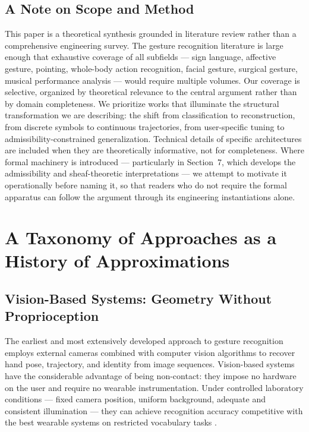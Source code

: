 \documentclass[11pt, a4paper]{article}
\theoremstyle{definition}
\begin{document}
\subsection{A Note on Scope and Method}

This paper is a theoretical synthesis grounded in literature review rather than a comprehensive engineering survey. The gesture recognition literature is large enough that exhaustive coverage of all subfields --- sign language, affective gesture, pointing, whole-body action recognition, facial gesture, surgical gesture, musical performance analysis --- would require multiple volumes. Our coverage is selective, organized by theoretical relevance to the central argument rather than by domain completeness. We prioritize works that illuminate the structural transformation we are describing: the shift from classification to reconstruction, from discrete symbols to continuous trajectories, from user-specific tuning to admissibility-constrained generalization. Technical details of specific architectures are included when they are theoretically informative, not for completeness. Where formal machinery is introduced --- particularly in Section~7, which develops the admissibility and sheaf-theoretic interpretations --- we attempt to motivate it operationally before naming it, so that readers who do not require the formal apparatus can follow the argument through its engineering instantiations alone.

\section{A Taxonomy of Approaches as a History of Approximations}

\subsection{Vision-Based Systems: Geometry Without Proprioception}

The earliest and most extensively developed approach to gesture recognition employs external cameras combined with computer vision algorithms to recover hand pose, trajectory, and identity from image sequences. Vision-based systems have the considerable advantage of being non-contact: they impose no hardware on the user and require no wearable instrumentation. Under controlled laboratory conditions --- fixed camera position, uniform background, adequate and consistent illumination --- they can achieve recognition accuracy competitive with the best wearable systems on restricted vocabulary tasks \cite{sharma2021,sarma2021,zaki2011}.
\end{document}
